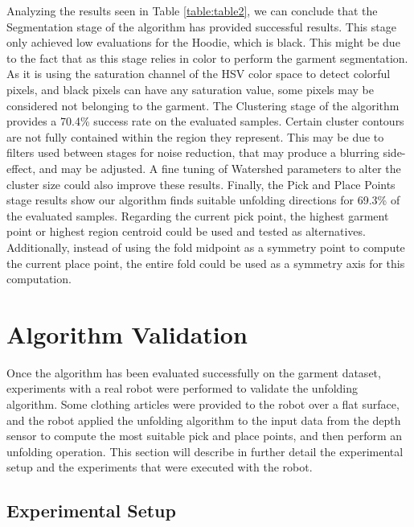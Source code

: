Analyzing the results seen in Table \ref{table:table2}, we can conclude that the Segmentation stage of the algorithm has provided successful results. This stage only achieved low evaluations for the Hoodie, which is black. This might be due to the fact that as this stage relies in color to perform the garment segmentation. As it is using the saturation channel of the HSV color space to detect colorful pixels, and black pixels can have any  saturation value, some pixels may be considered not belonging to the garment. The Clustering stage of the algorithm provides a 70.4\% success rate on the evaluated samples. Certain cluster contours are not fully contained within the region they represent. This may be due to filters used between stages for noise reduction, that may produce a blurring side-effect, and may be adjusted. A fine tuning of Watershed parameters to alter the cluster size could also improve these results. Finally, the Pick and Place Points stage results show our algorithm finds suitable unfolding directions for 69.3\% of the evaluated samples. Regarding the current pick point, the highest garment point or highest region centroid could be used and tested as alternatives. Additionally, instead of using the fold midpoint as a symmetry point to compute the current place point, the entire fold could be used as a symmetry axis for this computation. 

\section{Algorithm Validation}
\label{experiments:validation}

Once the algorithm has been evaluated successfully on the garment dataset, experiments with a real robot were performed to validate the unfolding algorithm. Some clothing articles were provided to the robot over a flat surface, and the robot applied the unfolding algorithm to the input data from the depth sensor to compute the most suitable pick and place points, and then perform an unfolding operation. This section will describe in further detail the experimental setup and the experiments that were executed with the robot.

\subsection{Experimental Setup}
\label{experiments:experimental_setup}

